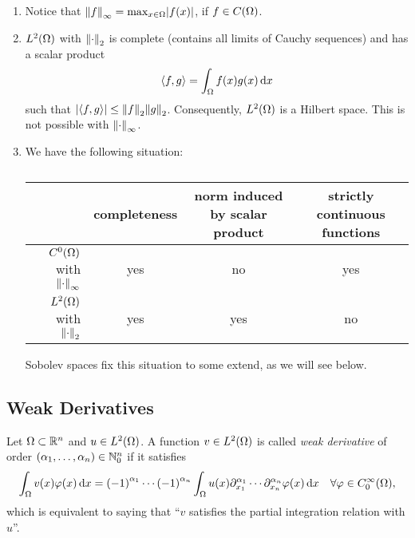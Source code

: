 \begin{remark}
	\begin{enumerate}
		\item Notice that \(\norm*{f}_\infty = \max_{x \in \Omega}\absolute*{f\parentheses*{x}}\), if \(f \in C\parentheses*{\Omega}\).
		\item \(L^2\parentheses*{\Omega}\) with \(\norm*{\cdot}_2\) is complete (contains all limits of Cauchy sequences) and has a scalar product
		\[
			\angles*{f, g} = \int_\Omega f\parentheses*{x}g\parentheses*{x}\d x
		\]
		such that \(\absolute*{\angles*{f, g}} \le \norm*{f}_2 \norm*{g}_2\).
		Consequently, \(L^2\parentheses*{\Omega}\) is a Hilbert space.
		This is not possible with \(\norm*{\cdot}_\infty\).
		\item We have the following situation:

		\begin{table}[h]
			\centering
			\begin{tabular}{r|ccc}
				\toprule
				& completeness & norm induced by scalar product & strictly continuous functions\\
				\midrule
				\(C^0\parentheses*{\Omega}\) with \(\norm*{\cdot}_\infty\) & yes & no & yes\\
				\(L^2\parentheses*{\Omega}\) with \(\norm*{\cdot}_2\) & yes & yes & no\\
				\bottomrule
			\end{tabular}
			\caption{}
			\label{tab:2-1}
		\end{table}

		Sobolev spaces fix this situation to some extend, as we will see below.
	\end{enumerate}
\end{remark}


\subsection{Weak Derivatives}

\begin{definition}
	Let \(\Omega \subset \R^n\) and \(u \in L^2\parentheses*{\Omega}\).
	A function \(v \in L^2\parentheses*{\Omega}\) is called \emph{weak derivative} of order \(\parentheses*{\alpha_1, \ldots, \alpha_n} \in \N_0^n\) if it satisfies
	\[
		\int_\Omega v\parentheses*{x}\varphi\parentheses*{x}\d x = \parentheses*{-1}^{\alpha_1}\cdots\parentheses*{-1}^{\alpha_n}\int_\Omega u\parentheses*{x}\partial_{x_1}^{\alpha_1}\cdots\partial_{x_n}^{\alpha_n}\varphi\parentheses*{x}\d x \quad \forall\varphi \in C_0^\infty\parentheses*{\Omega},
	\]
	which is equivalent to saying that ``\(v\) satisfies the partial integration relation with \(u\)''.
\end{definition}

